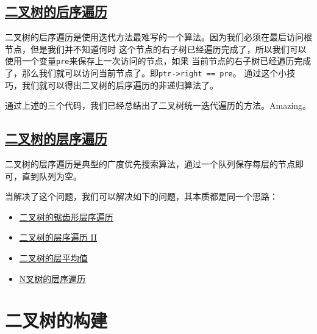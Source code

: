 \documentclass[../../main.tex]{subfiles}
\begin{document}
\subsection{\href{https://leetcode.cn/problems/binary-tree-postorder-traversal/}
{二叉树的后序遍历}}

二叉树的后序遍历是使用迭代方法最难写的一个算法。因为我们必须在最后访问根节点，但是我们并不知道何时
这个节点的右子树已经遍历完成了，所以我们可以使用一个变量\texttt{pre}来保存上一次访问的节点，如果
当前节点的右子树已经遍历完成了，那么我们就可以访问当前节点了。即\texttt{ptr->right == pre}。
通过这个小技巧，我们就可以得出二叉树的后序遍历的非递归算法了。

\begin{kaobox}[title=二叉树统一迭代遍历方法]
  通过上述的三个代码，我们已经总结出了二叉树统一迭代遍历的方法。Amazing。
\end{kaobox}



\subsection{\href{https://leetcode-cn.com/problems/binary-tree-level-order-traversal/}
{二叉树的层序遍历}}

二叉树的层序遍历是典型的广度优先搜索算法，通过一个队列保存每层的节点即可，直到队列为空。



当解决了这个问题，我们可以解决如下的问题，其本质都是同一个思路：

\begin{itemize}
  \item \href{https://leetcode-cn.com/problems/binary-tree-zigzag-level-order-traversal/}
  {二叉树的锯齿形层序遍历}
  \item \href{https://leetcode.cn/problems/binary-tree-level-order-traversal-ii}
  {二叉树的层序遍历 II}
  \item \href{https://leetcode.cn/problems/average-of-levels-in-binary-tree}
  {二叉树的层平均值}
  \item \href{https://leetcode.cn/problems/n-ary-tree-level-order-traversal}
  {N叉树的层序遍历}
\end{itemize}

\section{二叉树的构建}
\end{document}
